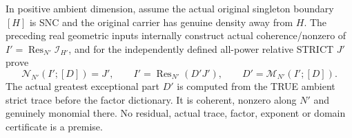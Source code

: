\begin{theorem}
\label{hir:sharp-actual-first-ambient-strict-trace-greatest-factor-relative-strict}
\leanok
In positive ambient dimension, assume the actual original singleton
boundary $[H]$ is SNC and the original carrier has genuine density away
from $H$. The preceding real geometric inputs internally construct actual
coherence/nonzero of $I'=\operatorname{Res}_{N'}\mathcal I_{H'}$, and for
the independently defined all-power relative STRICT $J'$ prove
\[
 \mathcal N_{N'}(I';[D])=J',\qquad
 I'=\operatorname{Res}_{N'}(D'J'),\qquad
 D'=\mathcal M_{N'}(I';[D]).
\]
The actual greatest exceptional part $D'$ is computed from the TRUE
ambient strict trace before the factor dictionary. It is coherent,
nonzero along $N'$ and genuinely monomial there. No residual, actual
trace, factor, exponent or domain certificate is a premise.
\end{theorem}
